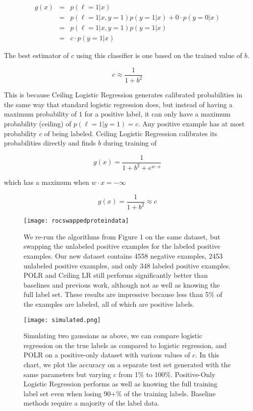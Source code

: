 \documentclass{article}
\begin{document}
\begin{eqnarray*}
g(x) &=& p(\ell=1|x) \\
 &=& p(\ell=1|x,y=1)p(y=1|x) + 0 \cdot p(y=0|x) \\
 &=& p(\ell=1|x,y=1)p(y=1|x) \\
 &=& c \cdot p(y=1|x)
\end{eqnarray*}

The best estimator of $c$ using this classifier is one based on the trained value of $b$.

$$c \approx \frac{1}{1 + b^2}$$

This is because Ceiling Logistic Regression generates calibrated probabilities in the same way that standard logistic regression does, but instead of having a maximum probability of $1$ for a positive label, it can only have a maximum probability (ceiling) of $p(\ell=1|y=1)=c$. Any positive example has at most probability $c$ of being labeled.  Ceiling Logistic Regression calibrates its probabilities directly and finds $b$ during training of

$$g(x) = \frac{1}{1 + b^2 + e^{w \cdot x}}$$

which has a maximum when $w \cdot x=-\infty$

$$g(x) = \frac{1}{1 + b^2} \approx c$$

\begin{figure*}[ht!]
\vskip 0.2in
\begin{center}
\centerline{\texttt{[image: rocswappedproteindata]}}
\caption{We re-run the algorithms from Figure 1 on the same dataset, but swapping the unlabeled positive examples for the labeled positive examples. Our new dataset contains 4558 negative examples, 2453 unlabeled positive examples, and only 348 labeled positive examples.  POLR and Ceiling LR still performs significantly better than baselines and previous work, although not as well as knowing the full label set.  These results are impressive because less than 5\% of the examples are labeled, all of which are positive labels.}
\label{rocswapped}
\end{center}
\vskip -0.2in
\end{figure*}

\begin{figure*}[ht!]
\vskip 0.2in
\begin{center}
\centerline{\texttt{[image: simulated.png]}}
\caption{Simulating two gaussians as above, we can compare logistic regression on the true labels as compared to logistic regression, and POLR on a positive-only dataset with various values of $c$. In this chart, we plot the accuracy on a separate test set generated with the same parameters but varying $c$ from 1\% to 100\%.  Positive-Only Logistic Regression performs as well as knowing the full training label set even when losing 90+\% of the training labels. Baseline methods require a majority of the label data.}
\label{synthetic}
\end{center}
\vskip -0.2in
\end{figure*}
\end{document}
